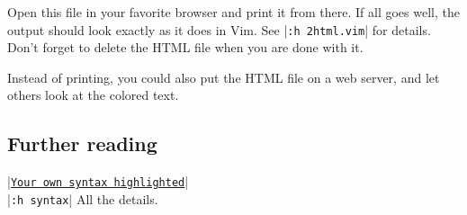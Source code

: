 Open this file in your favorite browser and print it from there.
If all goes well, the output should look exactly as it does in Vim.
See |\texttt{:h 2html.vim}| for details.
Don't forget to delete the HTML file when you are done with it.

Instead of printing, you could also put the HTML file on a web server, and let others look at the colored text.

\subsection{Further reading}
|\hyperref[Your own syntax highlighted]{\texttt{Your own syntax highlighted}}|\\
|\texttt{:h syntax}|      All the details.

\clearpage
